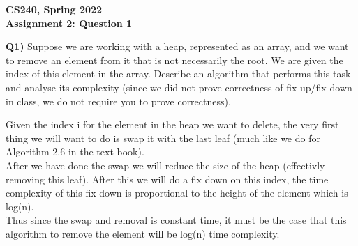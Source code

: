 \documentclass[12pt]{article}
\begin{document}
\begin{center}
{\Large\textbf{CS240, Spring 2022}}\\
\vspace{2mm}
{\Large\textbf{Assignment 2: Question 1}}\\
\vspace{3mm}
\end{center}
\[ \]
\textbf{Q1)} Suppose we are working with a heap, represented as an array, and we want to remove an element from it that is not necessarily the root.
We are given the index of this element in the array. Describe an
algorithm that performs this task and analyse its complexity (since we
did not prove correctness of fix-up/fix-down in class, we do
not require you to prove correctness).\\
\begin{adjustwidth}{0em}{0pt}
Given the index i for the element in the heap we want to delete, the very first thing we will want to do is swap it with the last leaf (much like we do for Algorithm 2.6 in the text book). \\

After we have done the swap we will reduce the size of the heap (effectivly removing this leaf). After this we will do a fix down on this index, the time complexity of this fix down is proportional to the height of the element which is log(n). \\

Thus since the swap and removal is constant time, it must be the case that this algorithm to remove the element will be log(n) time complexity.

\end{adjustwidth} 
\end{document}
